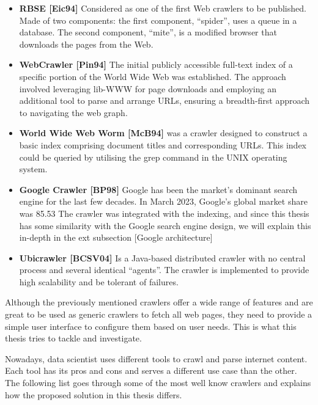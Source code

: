 \begin{itemize}
  \item \textbf{RBSE [Eic94]} Considered as one of the first Web crawlers to be published. Made of two components: the first component,
“spider”, uses a queue in a database. The second component, “mite”, is a modified browser that downloads the pages from the Web.
  \item \textbf{WebCrawler [Pin94]}  The initial publicly accessible full-text index of a specific portion of the World Wide Web was established. The approach involved leveraging lib-WWW for page downloads and employing an additional tool to parse and arrange URLs, ensuring a breadth-first approach to navigating the web graph.
  \item \textbf{World Wide Web Worm [McB94]} was a crawler designed to construct a basic index comprising document titles and corresponding URLs. This index could be queried by utilising the grep command in the UNIX operating system.
  \item \textbf{Google Crawler [BP98]} Google has been the market's dominant search engine for the last few decades. In March 2023, Google’s global market share was 85.53%
The crawler was integrated with the indexing, and since this thesis has some similarity with the Google search engine design, we will explain this in-depth in the ext subsection [Google architecture]
  \item \textbf{Ubicrawler [BCSV04]} Is a Java-based distributed crawler with no central process and several identical “agents”. The crawler is implemented to provide high scalability and be tolerant of failures.
\end{itemize}

Although the previously mentioned crawlers offer a wide range of features and are great to be used as generic crawlers to fetch all web pages, they need to provide a simple user interface to configure them based on user needs. This is what this thesis tries to tackle and investigate. 

Nowadays, data scientist uses different tools to crawl and parse internet content. Each tool has its pros and cons and serves a different use case than the other. The following list goes through some of the most well know crawlers and explains how the proposed solution in this thesis differs.  


